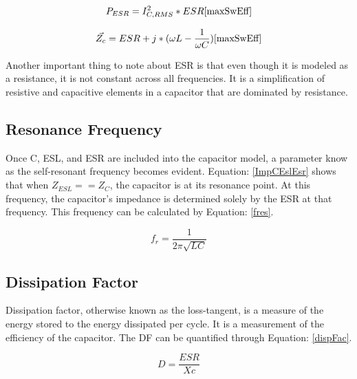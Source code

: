 \begin{equation}
\label{dcdcESReqn}
P_{ESR} = I_{C,RMS}^2 * ESR
\cite{maxSwEff}
\end{equation}

\begin{equation}
\label{ImpCEslEsr}
\vec{Z_c} = ESR + j * (\omega L - \frac{1}{\omega C})
\cite{maxSwEff}
\end{equation}

Another important thing to note about ESR is that even though it is modeled as a resistance, it is not constant across all frequencies. It is a simplification of resistive and capacitive elements in a capacitor that are dominated by resistance.

\subsection{Resonance Frequency}

Once C, ESL, and ESR are included into the capacitor model, a parameter know as the self-resonant frequency becomes evident. Equation: \eqref{ImpCEslEsr} shows that when $Z_{ESL} == Z_C$, the capacitor is at its resonance point. At this frequency, the capacitor's impedance is determined solely by the ESR at that frequency. This frequency can be calculated by Equation: \eqref{fres}.

\begin{equation}
\label{fres}
f_r = \frac{1}{2\pi \sqrt{LC}}
\end{equation}

\subsection{Dissipation Factor}

Dissipation factor, otherwise known as the loss-tangent, is a measure of the energy stored to the energy dissipated per cycle. It is a measurement of the efficiency of the capacitor. The DF can be quantified through Equation: \eqref{dispFac}. 

\begin{equation}
\label{dispFac}
D = \frac{ESR}{Xc}
\end{equation}

